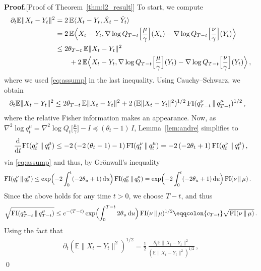 \documentclass[12pt]{article}
\newcommand{\E}{\mathbb{E}}
\newcommand{\1}{\mathds{1}}
\newcommand*{\rd}{\mathrm{d}}
\newcommand*{\dd}{\, \rd}
\newcommand{\mmid}{\,\Vert\,}
\renewenvironment{proof}{\noindent\textbf{Proof.}\hspace*{.3em}}{\qed \vspace{.1in}}
\theoremstyle{plain}
\theoremstyle{definition}
\theoremstyle{remark}
\begin{document}
\begin{proof}[Proof of Theorem~\ref{thm:l2_result}]
To start, we compute
\begin{align*}
    \partial_t \E\|X_t - Y_t\|^2 &= 2\, \E \langle X_t - Y_t, \dot{X}_t - \dot{Y}_t\rangle \\
    &= 2\,\E\Bigl\langle X_t - Y_t , \nabla \log Q_{T-t}\Bigl[\frac{\mu}{\gamma}\Bigr](X_t) - \nabla \log Q_{T-t}\Bigl[\frac{\nu}{\gamma}\Bigr](Y_t)\Bigr\rangle  \\
    &\leq  2\theta_{T-t}\,\E\|X_t - Y_t\|^2 \\
    &\qquad{} + 2\,\E \Bigl\langle X_t - Y_t, \nabla \log Q_{T-t}\Bigl[\frac{\mu}{\gamma}\Bigr](Y_t) - \nabla \log Q_{T-t}\Bigl[\frac{\nu}{\gamma}\Bigr](Y_t) \Bigr\rangle\,,
\end{align*}
where we used \eqref{eq:assump} in the last inequality. Using Cauchy--Schwarz, we obtain 
\begin{align}\label{eq:inequ}
    \partial_t \E\|X_t - Y_t\|^2 &\leq 2{\theta_{T-t}}\,\E\|X_t - Y_t\|^2 + 2\,(\E\|X_t - Y_t\|^2)^{1/2}\,{\rm{FI}}(q^\nu_{T-t}\mmid q^\mu_{T-t})^{1/2}\,,
\end{align}
where the relative Fisher information makes an appearance. Now, as $\nabla^2 \log q_t^\mu = \nabla^2 \log Q_t\bigl[\frac{\mu}{\gamma}\bigr] - I \preceq {(\theta_t-1)}\,I$, Lemma~\ref{lem:andre} simplifies to 
\begin{align*}
    \frac{{\rm d}}{{\rm d}t} {\rm FI}(q_{t}^\nu\mmid q_t^\mu)\leq -2\,(-2\,(\theta_t - {1})-1)\, {\rm FI}(q_t^\nu\mmid q_t^\mu) = -2\,(-2\theta_t + {1})\,{\rm FI}(q_t^\nu\mmid q_t^\mu)\,,
\end{align*}
via \eqref{eq:assump} and thus, by Gr\"onwall's inequality
\begin{align*}
    {\rm FI}(q_{t}^\nu\mmid q_t^\mu) &\leq \exp\Bigl(- 2\int_0^t (-2\theta_u+ {1}) \dd u \Bigr)\,{\rm FI}(q_0^\nu\mmid q_0^\mu) = \exp\Bigl(- 2\int_0^t (-2\theta_u+ {1}) \dd u \Bigr)\,{\rm FI}(\nu\mmid \mu)\,.
\end{align*}
Since the above holds for any time $t > 0$, we choose $T-t$, and thus
\begin{align*}
    \sqrt{{\rm FI}(q_{T-t}^\nu\mmid q_{T-t}^\mu)} \leq e^{-(T-t)}\exp\Bigl( \int_0^{T-t} 2\theta_u \dd u \Bigr)\,{\rm FI}(\nu\mmid \mu)^{1/2} \eqqcolon {c_{T-t}}\sqrt{{\rm FI}(\nu\mmid \mu)}\,. 
\end{align*}
Using the fact that
\begin{align*}
    \partial_t (\E\|X_t-Y_t\|^2)^{1/2} = \frac{1}{2}\,\frac{\partial_t \E\|X_t-Y_t\|^2}{(\E\|X_t-Y_t\|^2)^{1/2}}\,,

\end{align*}
\end{proof}
\end{document}
